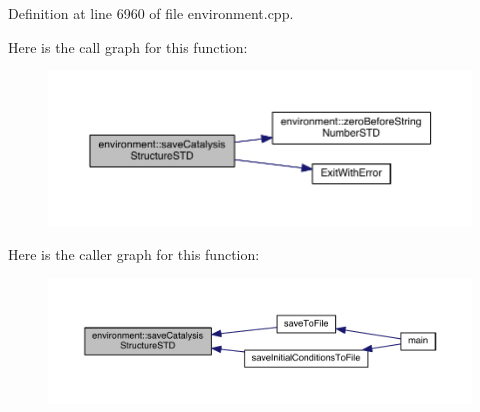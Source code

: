 Definition at line 6960 of file environment.\+cpp.



Here is the call graph for this function\+:\nopagebreak
\begin{figure}[H]
\begin{center}
\leavevmode
\includegraphics[width=350pt]{a00013_a0a799b3a42bd90845a915298e184708c_cgraph}
\end{center}
\end{figure}




Here is the caller graph for this function\+:\nopagebreak
\begin{figure}[H]
\begin{center}
\leavevmode
\includegraphics[width=350pt]{a00013_a0a799b3a42bd90845a915298e184708c_icgraph}
\end{center}
\end{figure}


